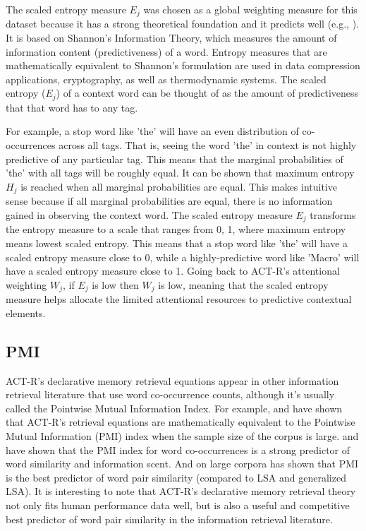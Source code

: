 \documentclass[10pt,letterpaper]{article}
\begin{document}
The scaled entropy measure $E_{j}$ was chosen as a global weighting measure for this dataset because it has a strong theoretical foundation and it predicts well (e.g., \cite{Dumais1991}).
It is based on Shannon's Information Theory, which measures the amount of information content (predictiveness) of a word.
Entropy measures that are mathematically equivalent to Shannon's formulation are used in data compression applications, cryptography, as well as thermodynamic systems.
The scaled entropy ($E_{j}$) of a context word can be thought of as the amount of predictiveness that that word has to any tag.

For example, a stop word like 'the' will have an even distribution of co-occurrences across all tags.
That is, seeing the word 'the' in context is not highly predictive of any particular tag.
This means that the marginal probabilities of 'the' with all tags will be roughly equal.
It can be shown that maximum entropy $H_{j}$ is reached when all marginal probabilities are equal.
This makes intuitive sense because if all marginal probabilities are equal, there is no information gained in observing the context word.
The scaled entropy measure $E_{j}$ transforms the entropy measure to a scale that ranges from 0, 1, where maximum entropy means lowest scaled entropy.
This means that a stop word like 'the' will have a scaled entropy measure close to 0, while a highly-predictive word like 'Macro' will have a scaled entropy measure close to 1.
Going back to ACT-R's attentional weighting $W_{j}$, if $E_{j}$ is low then $W_{j}$ is low, meaning that the scaled entropy measure helps allocate the limited attentional resources to predictive contextual elements.

\subsection{PMI}

ACT-R's declarative memory retrieval equations appear in other information retrieval literature that use word co-occurrence counts, although it's usually called the Pointwise Mutual Information Index.
For example, \cite{Fu2007} and \cite{Farahat2004} have shown that ACT-R's retrieval equations are mathematically equivalent to the Pointwise Mutual Information (PMI) index when the sample size of the corpus is large.
\cite{Budiu2007} and \cite{Farahat2004} have shown that the PMI index for word co-occurrences is a strong predictor of word similarity and information scent.
And on large corpora \cite{Budiu2007} has shown that PMI is the best predictor of word pair similarity (compared to LSA and generalized LSA).
It is interesting to note that ACT-R's declarative memory retrieval theory not only fits human performance data well, but is also a useful and competitive best predictor of word pair similarity in the information retrieval literature.
\end{document}
